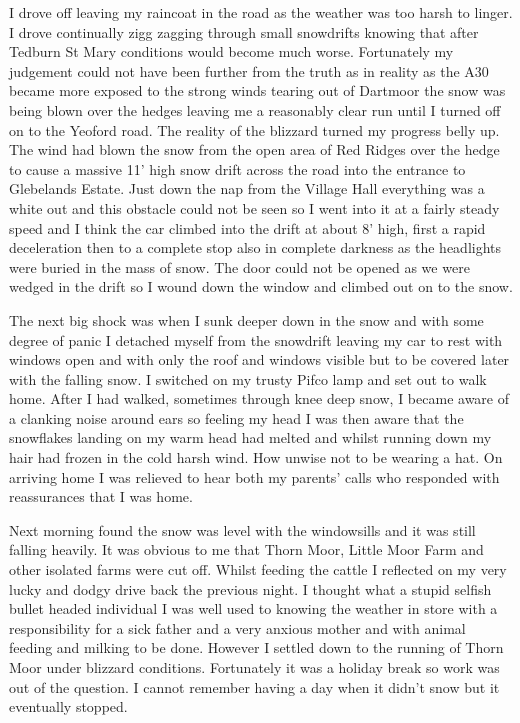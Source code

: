 I drove off leaving my raincoat in the road as the weather was too harsh to
linger. I drove continually zigg zagging through small snowdrifts knowing that
after Tedburn St Mary conditions would become much worse.  Fortunately my
judgement could not have been further from the truth as in reality as the A30
became more exposed to the strong winds tearing out of Dartmoor the snow was
being blown over the hedges leaving me a reasonably clear run until I turned
off on to the Yeoford road.  The reality of the blizzard turned my progress
belly up.  The wind had blown the snow from the open area of Red Ridges over
the hedge to cause a massive 11' high snow drift across the road into the
entrance to Glebelands Estate.  Just down the nap from the Village Hall
everything was a white out and this obstacle could not be seen so I went into
it at a fairly steady speed and I think the car climbed into the drift at about
8' high, first a rapid deceleration then to a complete stop also in complete
darkness as the headlights were buried in the mass of snow.  The door could not
be opened as we were wedged in the drift so I wound down the window and climbed
out on to the snow.

The next big shock was when I sunk deeper down in the snow and with some degree
of panic I detached myself from the snowdrift leaving my car to rest with
windows open and with only the roof and windows visible but to be covered later
with the falling snow.  I switched on my trusty Pifco lamp and set out to walk
home.  After I had walked, sometimes through knee deep snow, I became aware of
a clanking noise around ears so feeling my head I was then aware that the
snowflakes landing on my warm head had melted and whilst running down my hair
had frozen in the cold harsh wind.  How unwise not to be wearing a hat.  On
arriving home I was relieved to hear both my parents' calls who responded with
reassurances that I was home.

Next morning found the snow was level with the windowsills and it was still
falling heavily.  It was obvious to me that Thorn Moor, Little Moor Farm and
other isolated farms were cut off.  Whilst feeding the cattle I reflected on my
very lucky and dodgy drive back the previous night.  I thought what a stupid
selfish bullet headed individual I was well used to knowing the weather in
store with a responsibility for a sick father and a very anxious mother and
with animal feeding and milking to be done.  However I settled down to the
running of Thorn Moor under blizzard conditions.  Fortunately it was a holiday
break so work was out of the question.  I cannot remember having a day when it
didn't snow but it eventually stopped.

